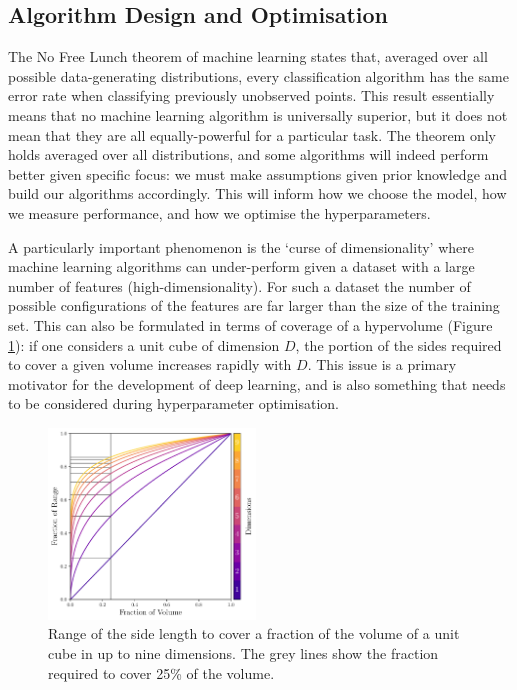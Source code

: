 \subsection{Algorithm Design and Optimisation}

The No Free Lunch theorem of machine learning states that, averaged over all possible data-generating distributions, every classification algorithm has the same error rate when classifying previously unobserved points.
This result essentially means that no machine learning algorithm is universally superior, but it does not mean that they are all equally-powerful for a particular task. 
The theorem only holds averaged over all distributions, and some algorithms will indeed perform better given specific focus: we must make assumptions given prior knowledge and build our algorithms accordingly.
This will inform how we choose the model, how we measure performance, and how we optimise the hyperparameters. 


A particularly important phenomenon is the `curse of dimensionality' where machine learning algorithms can under-perform given a dataset with a large number of features (high-dimensionality).
For such a dataset the number of possible configurations of the features are far larger than the size of the training set. 
This can also be formulated in terms of coverage of a hypervolume (Figure \ref{fig:machine_learning:curse_of_dimensionality}): if one considers a unit cube of dimension $D$, the portion of the sides required to cover a given volume increases rapidly with $D$.
This issue is a primary motivator for the development of deep learning, and is also something that needs to be considered during hyperparameter optimisation. 
\begin{figure}[h!]
    \begin{center}
        \includegraphics[width=0.49\textwidth]{figures/machine_learning/curse_of_dimensionality.pdf}
    \end{center}
    \caption{Range of the side length to cover a fraction of the volume of a unit cube in up to nine dimensions. The grey lines show the fraction required to cover 25\% of the volume.}
        \label{fig:machine_learning:curse_of_dimensionality}
\end{figure}


